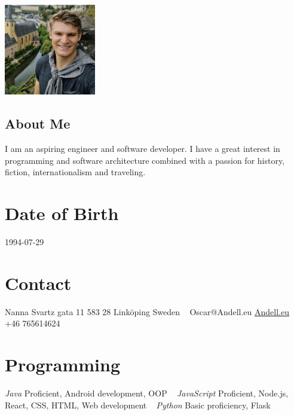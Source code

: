 \documentclass[]{k-cv} %
\begin{document}


\begin{aside} %
\includegraphics[width=4cm, height=4cm]{oscar2.jpg}
\begin{flushleft}
\section{About Me}
\color{gray}I am an aspiring engineer and software developer. I have a great interest in programming and software architecture combined with a passion for history, fiction, internationalism and traveling. 
\end{flushleft}
\section{Date of Birth}
\color{gray}1994-07-29
\section{Contact}
Nanna Svartz gata 11
583 28 Linköping
Sweden
~
Oscar@Andell.eu
\href{http://Andell.eu/Oscar}{Andell.eu}
+46 765614624

\section{Programming}
\color{black}\textit{Java}
\color{gray}Proficient, Android development, OOP
~
\color{black}\textit{JavaScript}
\color{gray}Proficient, Node.js, React, CSS, HTML, Web development
~
\color{black}\textit{Python}
\color{gray}Basic proficiency, Flask
\end{aside}

\end{document}
